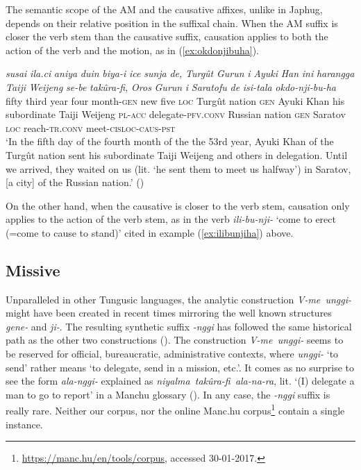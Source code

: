 \documentclass{article}
\newcommand{\ipa}[1]{\textit{{\phon\mbox{#1}}}} %
\begin{document}
The semantic scope of the AM and the causative affixes, unlike in Japhug, depends on their relative position in the suffixal chain. When the AM suffix is closer the verb stem than the causative suffix, causation applies to both the action of the verb and the motion, as in (\ref{ex:okdonjibuha}).

\begin{exe}
\ex \label{ex:okdonjibuha}
\gll 
\ipa{susai}	\ipa{ila.ci}	\ipa{aniya}	\ipa{duin}	\ipa{biya-i}	\ipa{ice}	\ipa{sunja}	\ipa{de,}	\ipa{Turgût}	\ipa{Gurun}	\ipa{i}	\ipa{Ayuki}	\ipa{Han}	\ipa{ini}	\ipa{harangga}	\ipa{Taiji}	\ipa{Weijeng}	\ipa{se-be}	\ipa{takûra-fi,}	\ipa{Oros}	\ipa{Gurun}	\ipa{i}	\ipa{Saratofu}	\ipa{de}	\ipa{isi-tala}	\ipa{okdo-nji-bu-ha} \\
fifty third year four month-\textsc{gen} new five \textsc{loc} Turgût nation \textsc{gen} Ayuki Khan his subordinate Taiji Weijeng \textsc{pl-acc} delegate-\textsc{pfv.conv} Russian nation \textsc{gen} Saratov \textsc{loc} reach-\textsc{tr.conv} meet-\textsc{cisloc-caus-pst} \\
\glt ‘In the fifth day of the fourth month of the the 53rd year, Ayuki Khan of the Turgût nation sent his subordinate Taiji Weijeng and others in delegation. Until we arrived,
they waited on us (lit. `he sent them to meet us halfway’) in Saratov, [a city] of the Russian nation.’ (\citealt[175;88b-89a]{shunjuu64tulishen})
\end{exe}

On the other hand, when the causative is closer to the verb stem, causation only applies to the action of the verb stem, as in the verb \ipa{ili-bu-nji-} `come to erect (=come to cause to stand)' cited in example (\ref{ex:ilibunjiha}) above.

\subsection{Missive} \label{sec:nggi}
Unparalleled in other Tungusic languages, the analytic construction \ipa{V-me unggi-} might have been  created in recent times mirroring the well known structures \ipa{gene-} and \ipa{ji-}. The resulting synthetic suffix \ipa{-nggi} has followed the same historical path as the other two constructions (\citealt[163]{zaxarov10manchu}). The construction  \ipa{V-me unggi-} seems to be reserved for official, bureaucratic, administrative contexts, where  \ipa{unggi-} ‘to send’ rather means ‘to delegate, send in a mission, etc.’. It comes as no surprise to see the form  \ipa{ala-nggi-} explained as  \ipa{niyalma takûra-fi ala-na-ra}, lit. ‘(I) delegate a man to go to report’ in a Manchu glossary (\citealt[157]{enxbat16leksika}).  In any case, the \ipa{-nggi} suffix is really rare. Neither our corpus, nor the online Manc.hu corpus\footnote{ \url{https://manc.hu/en/tools/corpus}, accessed 30-01-2017.} contain a single instance.
\end{document}

